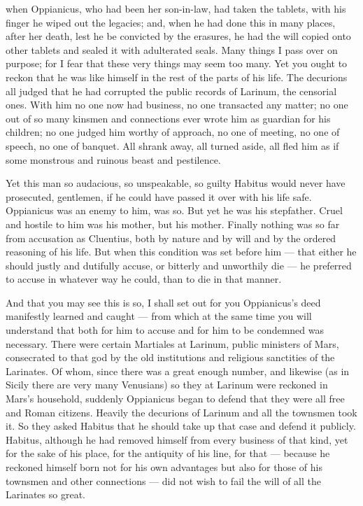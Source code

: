  when Oppianicus, who had been her son-in-law, had taken the tablets, with his finger he wiped out the legacies; and, when he had done this in many places, after her death, lest he be convicted by the erasures, he had the will copied onto other tablets and sealed it with adulterated seals. Many things I pass over on purpose; for I fear that these very things may seem too many. Yet you ought to reckon that he was like himself in the rest of the parts of his life. The decurions all judged that he had corrupted the public records of Larinum, the censorial ones. With him no one now had business, no one transacted any matter; no one out of so many kinsmen and connections ever wrote him as guardian for his children; no one judged him worthy of approach, no one of meeting, no one of speech, no one of banquet. All shrank away, all turned aside, all fled him as if some monstrous and ruinous beast and pestilence.

 Yet this man so audacious, so unspeakable, so guilty Habitus would never have prosecuted, gentlemen, if he could have passed it over with his life safe. Oppianicus was an enemy to him, was so. But yet he was his stepfather. Cruel and hostile to him was his mother, but his mother. Finally nothing was so far from accusation as Cluentius, both by nature and by will and by the ordered reasoning of his life. But when this condition was set before him --- that either he should justly and dutifully accuse, or bitterly and unworthily die --- he preferred to accuse in whatever way he could, than to die in that manner.

 And that you may see this is so, I shall set out for you Oppianicus's deed manifestly learned and caught --- from which at the same time you will understand that both for him to accuse and for him to be condemned was necessary. There were certain Martiales at Larinum, public ministers of Mars, consecrated to that god by the old institutions and religious sanctities of the Larinates. Of whom, since there was a great enough number, and likewise (as in Sicily there are very many Venusians) so they at Larinum were reckoned in Mars's household, suddenly Oppianicus began to defend that they were all free and Roman citizens. Heavily the decurions of Larinum and all the townsmen took it. So they asked Habitus that he should take up that case and defend it publicly. Habitus, although he had removed himself from every business of that kind, yet for the sake of his place, for the antiquity of his line, for that --- because he reckoned himself born not for his own advantages but also for those of his townsmen and other connections --- did not wish to fail the will of all the Larinates so great.

